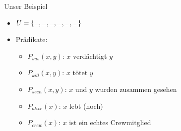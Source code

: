 \begin{frame}{Unser Beispiel}
    \begin{itemize}
        \item $U = \{\sus{red}, \sus{green}, \sus{blue}, \sus{white}, \sus{yellow}, \sus{magenta}\}$
        \item Prädikate:
        \begin{itemize}
            \item $P_{sus}(x,y)$: $x$ verdächtigt $y$
            \item $P_{kill}(x,y)$: $x$ tötet $y$
            \item $P_{seen}(x,y)$: $x$ und $y$ wurden zusammen gesehen
            \item $P_{alive}(x)$: $x$ lebt (noch)
            \item $P_{crew}(x)$: $x$ ist ein echtes Crewmitglied
        \end{itemize}
    \end{itemize}
\end{frame}

